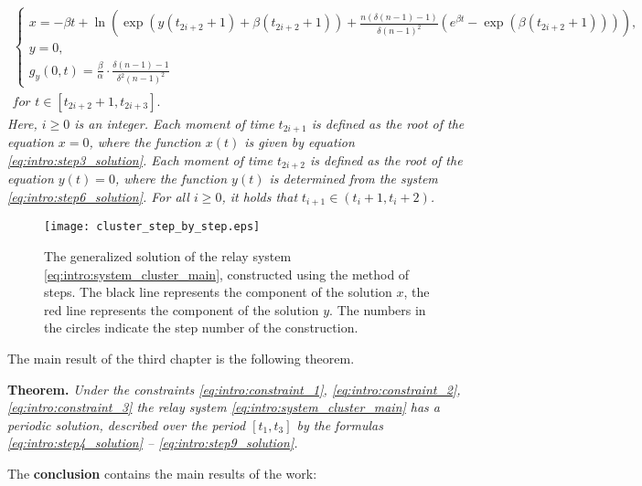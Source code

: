 %
\begin{multline}
	\label{eq:intro:step9_solution}
	\begin{cases}
		x = -\beta t + \ln\left(\exp(y(t_{2i + 2} + 1) + \beta(t_{2i + 2} + 1)) + \frac{n (\delta(n - 1) - 1)}{\delta (n - 1)^2} (e^{\beta t} - \exp(\beta (t_{2i + 2} + 1))) \right),\\
		y = 0,\\
		g_y(0, t) = \frac{\beta}{\alpha} \cdot \frac{\delta (n - 1) - 1}{\delta^2 (n - 1)^2}
	\end{cases}\\
	\textit{for } t \in [t_{2i + 2} + 1, t_{2i + 3}].
\end{multline}
\normalsize
%	
\textit{Here, $i \geqslant 0$ is an integer. Each moment of time $t_{2i + 1}$ is defined as the root of the equation $x = 0$, where the function $x(t)$ is given by equation \eqref{eq:intro:step3_solution}. Each moment of time $t_{2i + 2}$ is defined as the root of the equation $y(t) = 0$, where the function $y(t)$ is determined from the system \eqref{eq:intro:step6_solution}. For all $i \geqslant 0$, it holds that $t_{i + 1} \in (t_i + 1, t_i + 2)$.}


\begin{figure}[!ht]
	\centering
	\texttt{[image: cluster\_step\_by\_step.eps]}
	\caption{The generalized solution of the relay system \eqref{eq:intro:system_cluster_main}, constructed using the method of steps. The black line represents the component of the solution $x$, the red line represents the component of the solution $y$. The numbers in the circles indicate the step number of the construction.}
	\label{fig:intro:cluster_step_by_step}
\end{figure}

The main result of the third chapter is the following theorem.

\textbf{Theorem.} \textit{Under the constraints \eqref{eq:intro:constraint_1}, \eqref{eq:intro:constraint_2}, \eqref{eq:intro:constraint_3} the relay system \eqref{eq:intro:system_cluster_main} has a periodic solution, described over the period $[t_1, t_3]$ by the formulas \eqref{eq:intro:step4_solution} -- \eqref{eq:intro:step9_solution}.}

\FloatBarrier
{}                                  %

The \textbf{conclusion} contains the main results of the work:



